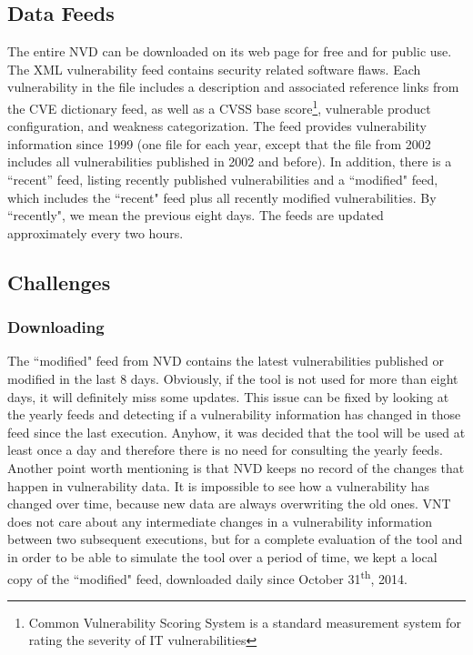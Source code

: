 \subsection{Data Feeds}
The entire NVD can be downloaded on its web page for free and for public use. The XML vulnerability feed contains security related software flaws. Each vulnerability in the file includes a description and associated reference links from the CVE dictionary feed, as well as a CVSS base score\footnote{Common Vulnerability Scoring System is a standard measurement system for rating the severity of IT vulnerabilities}, vulnerable product configuration, and weakness categorization. The feed provides vulnerability information since 1999 (one file for each year, except that the file from 2002 includes all vulnerabilities published in 2002 and before). In addition, there is a ``recent'' feed, listing recently published vulnerabilities and a ``modified" feed, which includes the ``recent" feed plus all recently modified vulnerabilities. By ``recently", we mean the previous eight days. The feeds are updated approximately every two hours.


\subsection{Challenges}
\subsubsection{Downloading}
The ``modified" feed from NVD contains the latest vulnerabilities published or modified in the last 8 days. Obviously, if the tool is not used for more than eight days, it will definitely miss some updates. This issue can be fixed by looking at the yearly feeds and detecting if a vulnerability information has changed in those feed since the last execution. Anyhow, it was decided that the tool will be used at least once a day and therefore there is no need for consulting the yearly feeds. 
Another point worth mentioning is that NVD keeps no record of the changes that happen in vulnerability data. It is impossible to see how a vulnerability has changed over time, because new data are always overwriting the old ones. VNT does not care about any intermediate changes in a vulnerability information between two subsequent executions, but for a complete evaluation of the tool and in order to be able to simulate the tool over a period of time, we kept a local copy of the ``modified" feed, downloaded daily since October 31\textsuperscript{th}, 2014. 

